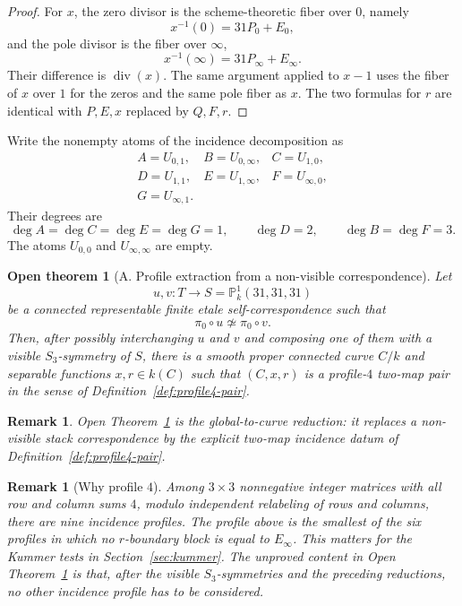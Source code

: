 \documentclass[11pt]{amsart}
\newtheorem{opentheorem}[theorem]{Open theorem}
\newtheorem{remark}[theorem]{Remark}
\newcommand{\PP}{\mathbb P}
\newcommand{\Div}{\operatorname{div}}
\begin{document}
\begin{proof}
For \(x\), the zero divisor is the scheme-theoretic fiber over \(0\), namely
\[
  x^{-1}(0)=31P_0+E_0,
\]
and the pole divisor is the fiber over \(\infty\),
\[
  x^{-1}(\infty)=31P_\infty+E_\infty.
\]
Their difference is \(\Div(x)\).  The same argument applied to \(x-1\) uses
the fiber of \(x\) over \(1\) for the zeros and the same pole fiber as \(x\).
The two formulas for \(r\) are identical with \(P,E,x\) replaced by
\(Q,F,r\).
\end{proof}

Write the nonempty atoms of the incidence decomposition as
\[
\begin{array}{lll}
 A=U_{0,1}, & B=U_{0,\infty}, & C=U_{1,0},\\
 D=U_{1,1}, & E=U_{1,\infty}, & F=U_{\infty,0},\\
 G=U_{\infty,1}. &&
\end{array}
\]
Their degrees are
\[
  \deg A=\deg C=\deg E=\deg G=1,\qquad
  \deg D=2,\qquad
  \deg B=\deg F=3.
\]
The atoms \(U_{0,0}\) and \(U_{\infty,\infty}\) are empty.

\begin{opentheorem}[A. Profile extraction from a non-visible correspondence]
\label{open:profile-extraction}
Let
\[
  u,v:T\to S=\PP^1_k(31,31,31)
\]
be a connected representable finite etale self-correspondence such that
\[
  \pi_0\circ u\not\simeq \pi_0\circ v.
\]
Then, after possibly interchanging \(u\) and \(v\) and composing one of them
with a visible \(S_3\)-symmetry of \(S\), there is a smooth proper connected
curve \(C/k\) and separable functions \(x,r\in k(C)\) such that
\((C,x,r)\) is a profile-\(4\) two-map pair in the sense of
Definition~\ref{def:profile4-pair}.
\end{opentheorem}

\begin{remark}
Open Theorem~\ref{open:profile-extraction} is the global-to-curve reduction:
it replaces a non-visible stack correspondence by the explicit two-map
incidence datum of Definition~\ref{def:profile4-pair}.
\end{remark}

\begin{remark}[Why profile \(4\)]
Among \(3\times3\) nonnegative integer matrices with all row and column sums
\(4\), modulo independent relabeling of rows and columns, there are nine
incidence profiles.  The profile above is the smallest of the six profiles in
which no \(r\)-boundary block is equal to \(E_\infty\).  This matters for the
Kummer tests in Section~\ref{sec:kummer}.  The unproved content in
Open Theorem~\ref{open:profile-extraction} is that, after the visible
\(S_3\)-symmetries and the preceding reductions, no other incidence profile
has to be considered.
\end{remark}
\end{document}
